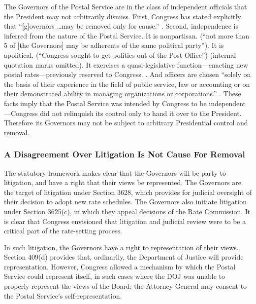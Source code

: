 \documentclass[12pt,\documentclassflag]{complaint}
\begin{document}
The Governors of the Postal Service are in the class of independent officials that the President may not arbitrarily dismiss.  First, Congress has stated explicitly that ``[g]overnors \ldots may be removed only for cause.'' .  Second, independence is inferred from the nature of the Postal Service.  It is nonpartisan.  \See  {} (``not more than 5 of [the Governors] may be adherents of the same political party'').  It is apolitical. \See {} (``Congress sought to get politics out of the Post Office'') (internal quotation marks omitted). It exercises a quasi-legislative function---enacting new postal rates---previously reserved to Congress. \See {}. And officers are chosen ``solely on the basis of their experience in the field of public service, law or accounting or on their demonstrated ability in managing organizations or corporations.'' .  These facts imply that the Postal Service was intended by Congress to be independent---Congress did not relinquish its control only to hand it over to the President.  Therefore its Governors may not be subject to arbitrary Presidential control and removal.

\subsubsection{A Disagreement Over Litigation Is Not Cause For Removal}

The statutory framework makes clear that the Governors will be party to litigation, and have a right that their views be represented.   The Governors are the target of litigation under Section 3628, which provides for judicial oversight of their decision to adopt new rate schedules.  The Governors also initiate litigation under Section 3625(c), in which they appeal decisions of the Rate Commission.  It is clear that Congress envisioned that litigation and judicial review were to be a critical part of the rate-setting process. 

In such litigation, the Governors have a right to representation of their views.  Section 409(d) provides that, ordinarily, the Department of Justice will provide representation.  However, Congress allowed a mechanism by which the Postal Service could represent itself, in such cases where the DOJ was unable to properly represent the views of the Board: the Attorney General may consent to the Postal Service's self-representation. 
\end{document}
